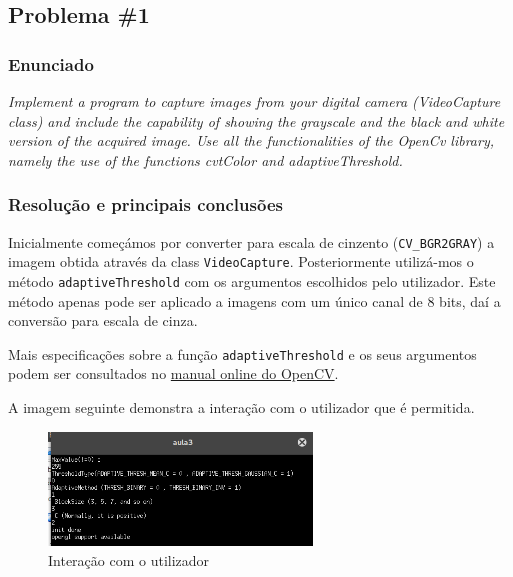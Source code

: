 \documentclass[portuguese, times, mirror]{revdetua}
\begin{document}
\subsection{Problema \#1}

\subsubsection{Enunciado}
\textit{ Implement a program to capture images from your digital camera (VideoCapture class) and
include the capability of showing the grayscale and the black and white version of the acquired
image.
Use all the functionalities of the OpenCv library, namely the use of the functions cvtColor and
adaptiveThreshold.}


\subsubsection{Resolução e principais conclusões}


Inicialmente começámos por converter para escala de cinzento (\texttt{CV\_BGR2GRAY}) a imagem obtida através da class \texttt{VideoCapture}. Posteriormente utilizá-mos o método \texttt{adaptiveThreshold} com os argumentos escolhidos pelo utilizador. Este método apenas pode ser aplicado a imagens com um único canal de 8 bits, daí a conversão para escala de cinza. 

Mais especificações sobre a função \texttt{adaptiveThreshold} e os seus argumentos podem ser consultados no \href{http://docs.opencv.org/2.4/modules/imgproc/doc/miscellaneous_transformations.html}{manual online do OpenCV}. 





\newpage

A imagem seguinte demonstra a interação com o utilizador que é permitida. 

\begin{figure}[ht!]
\centering
\includegraphics[width=70mm]{img/ex1_2.png}
\caption{Interação com o utilizador}
\end{figure}
\end{document}
